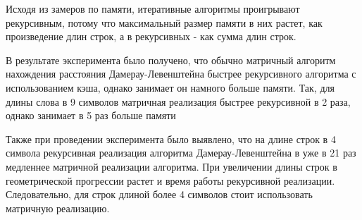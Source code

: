 Исходя из замеров по памяти, итеративные алгоритмы проигрывают рекурсивным, потому что максимальный размер памяти в них растет, как произведение длин строк, а в рекурсивных - как сумма длин строк.

В результате эксперимента было получено, что обычно матричный алгоритм нахождения расстояния Дамерау-Левенштейна быстрее рекурсивного алгоритма с использованием кэша, однако занимает он намного больше памяти. Так, для длины слова в 9 символов матричная реализация быстрее рекурсивной в 2 раза, однако занимает в 5 раз больше памяти

Также при проведении эксперимента было выявлено, что на длине строк в 4 символа рекурсивная реализация алгоритма Дамерау-Левенштейна в уже в 21 раз медленнее матричной реализации алгоритма. При увеличении длины строк в геометрической прогрессии растет и время работы рекурсивной реализации. Следовательно, для строк длиной более 4 символов стоит использовать матричную реализацию.
